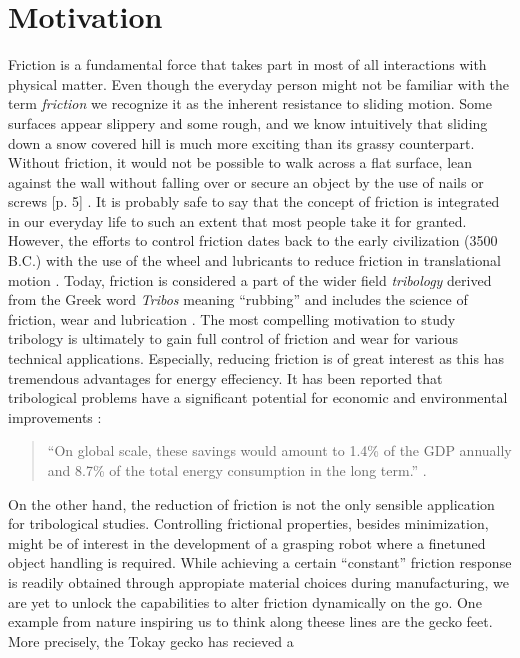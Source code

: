 \section{Motivation}
Friction is a fundamental force that takes part in most of all interactions with
physical matter. Even though the everyday person might not be familiar with the
term \textit{friction} we recognize it as the inherent resistance to sliding
motion. Some surfaces appear slippery and some rough, and we know intuitively
that sliding down a snow covered hill is much more exciting than its grassy
counterpart. Without friction, it would not be possible to walk across a flat
surface, lean against the wall without falling over or secure an object by the
use of nails or screws [p. 5] \cite{gnecco_meyer_2015}. It is probably safe to
say that the concept of friction is integrated in our everyday life to such an
extent that most people take it for granted. However, the efforts to control
friction dates back to the early civilization (3500 B.C.) with the use of the
wheel and lubricants to reduce friction in translational motion
\cite{bhushan_2013}. Today, friction is considered a part of the wider field
\textit{tribology} derived from the Greek word \textit{Tribos} meaning
``rubbing'' and includes the science of friction, wear and lubrication
\cite{bhushan_2013}. The most compelling motivation to study tribology is
ultimately to gain full control of friction and wear for various technical
applications. Especially, reducing friction is of great interest as this has
tremendous advantages for energy effeciency. It has been reported that
tribological problems have a significant potential for economic and
environmental improvements \cite{kim_nano-scale_2009}:
\begin{quote}
    ``On global scale, these savings would amount to 1.4\% of the GDP annually
    and 8.7\% of the total energy consumption in the long term.''
    \cite{holmberg_influence_2017}. 
\end{quote}
On the other hand, the reduction of friction is not the only sensible
application for tribological studies. Controlling frictional properties, besides
minimization, might be of interest in the development of a grasping robot where
a finetuned object handling is required. While achieving a certain ``constant''
friction response is readily obtained through appropiate material choices during
manufacturing, we are yet to unlock the capabilities to alter friction
dynamically on the go. One example from nature inspiring us to think along
theese lines are the gecko feet. More precisely, the Tokay gecko has recieved a
